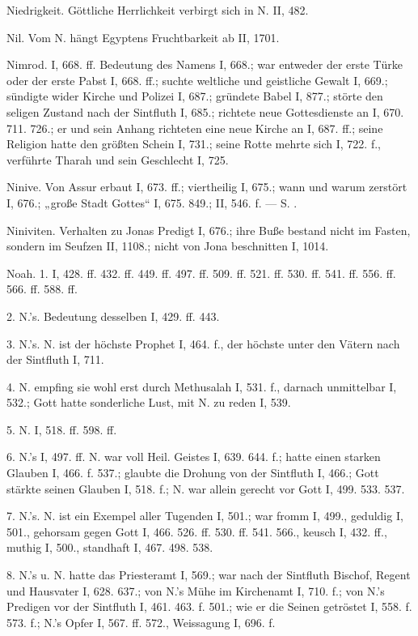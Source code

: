 Niedrigkeit. Göttliche Herrlichkeit verbirgt sich in N. II, 482.

Nil. Vom N. hängt Egyptens Fruchtbarkeit ab II, 1701.

Nimrod. I, 668. ff. Bedeutung des Namens I, 668.; war entweder der erste Türke oder der erste Pabst I, 668. ff.; suchte weltliche und geistliche Gewalt I, 669.; sündigte wider Kirche und Polizei I, 687.; gründete Babel I, 877.; störte den seligen Zustand nach der Sintfluth I, 685.; richtete neue Gottesdienste an I, 670.
711. 726.; er und sein Anhang richteten eine neue Kirche an I, 687. ff.; seine Religion hatte den größten Schein I, 731.; seine Rotte mehrte sich I, 722. f., verführte Tharah und sein Geschlecht I, 725.

Ninive. Von Assur erbaut I, 673. ff.; viertheilig I, 675.; wann und warum zerstört I, 676.; „große Stadt Gottes“ I, 675. 849.; II, 546. f. — S. .

Niniviten. Verhalten zu Jonas Predigt I, 676.; ihre Buße bestand nicht im Fasten, sondern im Seufzen II, 1108.; nicht von Jona beschnitten I, 1014.

Noah. 1.  I, 428. ff. 432. ff. 449. ff. 497. ff. 509. ff. 521. ff. 530. ff. 541. ff. 556. ff. 566. ff. 588. ff.

2.  N.’s. Bedeutung desselben I, 429. ff. 443.

3.  N.’s. N. ist der höchste Prophet I, 464. f., der höchste unter den Vätern nach der Sintfluth I, 711.

4.  N. empfing sie wohl erst durch Methusalah I, 531. f., darnach unmittelbar I, 532.; Gott hatte sonderliche Lust, mit N. zu reden I, 539.

5.  N. I, 518. ff. 598. ff.

6.  N.’s  I, 497. ff. N. war voll Heil. Geistes I, 639. 644. f.; hatte einen starken Glauben I, 466. f. 537.; glaubte die Drohung von der Sintfluth I, 466.; Gott stärkte seinen Glauben I, 518. f.; N. war allein gerecht vor Gott I, 499. 533. 537.

7.  N.’s. N. ist ein Exempel aller Tugenden I, 501.; war fromm I, 499., geduldig I, 501., gehorsam gegen Gott I, 466. 526. ff. 530. ff. 541. 566., keusch I, 432. ff., muthig I, 500., standhaft I, 467. 498. 538.

8. N.’s  u.  N. hatte das Priesteramt I, 569.; war nach der Sintfluth Bischof, Regent und Hausvater I, 628. 637.; von N.’s Mühe im Kirchenamt I, 710. f.; von N.’s Predigen vor der Sintfluth I, 461. 463. f. 501.; wie er die Seinen getröstet I, 558. f. 573. f.; N.’s Opfer I, 567. ff. 572., Weissagung I, 696. f.

